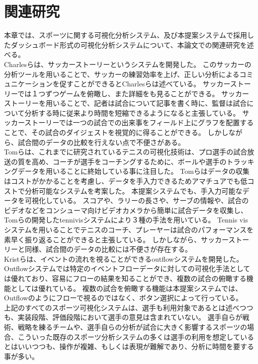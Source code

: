 \documentclass[sotsuron]{kuee}
\begin{document}
\chapter{関連研究}
本章では、スポーツに関する可視化分析システム、及び本提案システムで採用したダッシュボード形式の可視化分析システムについて、本論文での関連研究を述べる。
\\Charlesらは、サッカーストーリーというシステムを開発した。
このサッカーの分析ツールを用いることで、サッカーの練習効率を上げ、正しい分析によるコミュニケーションを促すことができるとCharlesらは述べている。
サッカーストーリーでは１つずつゲームを俯瞰し、また詳細をも見ることができる。
サッカーストーリーを用いることで、記者は試合について記事を書く時に、監督は試合について分析する時に従来より時間を短縮できるようになると主張している。
サッカーストーリーでは一つの試合での出来事をフィールド上にグラフを配置することで、その試合のダイジェストを視覚的に得ることができる。
しかしながら、試合間のデータの比較を行えない点で不便さがある。
\\Tomらは、これまでに研究されているテニスの可視化技術は、プロ選手の試合放送の質を高め、コーチが選手をコーチングするために、ボールや選手のトラッキングデータを用いることに終始している事に注目した。
Tomらはデータの収集はコストがかかることを考慮し、データを手入力できるためアマチュアでも低コストで分析可能なシステムを考案した。
本提案システムでも、手入力可能なデータを可視化している。
スコアや、ラリーの長さや、サーブの情報や、試合のビデオなどをコンシューマ向けビデオカメラから簡単に試合データを収集し、Tomらの開発したtennivisシステムにより３種の手法を用いている。
Tennis visシステムを用いることでテニスのコーチ、プレーヤーは試合のパフォーマンスを素早く振り返ることができると主張している。
しかしながら、サッカーストーリーと同様、試合間のデータの比較には不便さが存在する。
\\Kristらは、イベントの流れを視ることができるoutflowシステムを開発した。
Outflowシステムでは特定のイベントフローデータに対しての可視化手法としては優れており、容易にフローの結果を知ることができ、複数の試合の俯瞰する機能としては優れている。
複数の試合を俯瞰する機能は本提案システムでは、Outflowのようにフローで視るのではなく、ボタン選択によって行っている。	
\\上記のすべてのスポーツ可視化システムは、選手も利用対象であるとは述べつつも、実装段階、評価段階において選手の意見は含まれていない。
選手自らが戦術、戦略を練るチームや、選手自らの分析が試合に大きく影響するスポーツの場合、こういった既存のスポーツ分析システムの多くは選手の利用を想定しているとはいいつつも、操作が複雑、もしくは表現が難解であり、分析に時間を要する事が多い。
\end{document}

